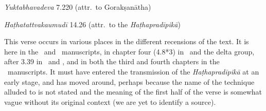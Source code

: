 \begin{ekdosis}
\begin{testimonia}[hp03_049_2]
\emph{Yuktabhavadeva} 7.220 (attr.~to Gorakṣanātha)
\begin{versinnote}
\end{versinnote}

\emph{Haṭhatattvakaumudī} 14.26 (attr.~to the \emph{Haṭhapradīpikā})
\begin{versinnote}
\end{versinnote}

\end{testimonia}

\begin{philcomm}[hp03_049_2]

This verse occurs in various places in the different recensions of the text. It is here in the \alphaTwo\ and \alphaThree\ manuscripts, in chapter four (4.8*3) in \alphaOne\ and the delta group, after 3.39 in \betaOne\ and \betaTwo, and in both the third and fourth chapters in the \textgamma\ manuscripts. It must have entered the transmission of the \emph{Haṭhapradīpikā} at an early stage, and has moved around, perhaps because the name of the technique alluded to is not stated and the meaning of the first half of the verse is somewhat vague without its original context (we are yet to identify a source).


\end{philcomm}
\end{ekdosis}
